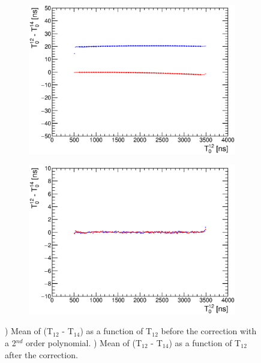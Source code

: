 \documentclass{JINST}
\begin{document}
\begin{figure}[htbp!]
  \begin{subfigure}[t]{0.49\textwidth}
    \centering
    \includegraphics[width=1\linewidth]{fig/Profiles_DeviationT0_12_14.eps}
    \caption{} \label{fig:T0PolyBefore}
  \end{subfigure}
  \hfill
  \begin{subfigure}[t]{0.49\textwidth}
    \centering
    \includegraphics[width=1\linewidth]{fig/Profiles_DeviationT0_12_14_Corrected.eps}
    \caption{} \label{fig:T0PolyAfter}
  \end{subfigure}
  \caption{) Mean of (T$_{12}$ - T$_{14}$) as a function of T$_{12}$ before the correction with a 2$^{nd}$ order polynomial. ) Mean of (T$_{12}$ - T$_{14}$) as a function of T$_{12}$ after the correction.}
\end{figure}
\end{document}
